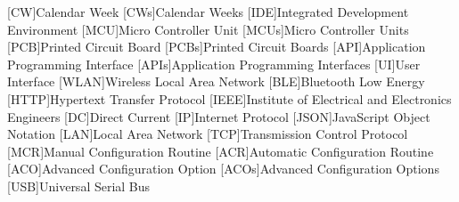 % 
\begin{acronym}[STATCOM]    %
%
[CW]{Calendar Week}
[CWs]{Calendar Weeks}
%
[IDE]{Integrated Development Environment}
%
[MCU]{Micro Controller Unit}
[MCUs]{Micro Controller Units}
%
[PCB]{Printed Circuit Board}
[PCBs]{Printed Circuit Boards}
%
[API]{Application Programming Interface}
[APIs]{Application Programming Interfaces}
%
[UI]{User Interface}
%
[WLAN]{Wireless Local Area Network}
%
[BLE]{Bluetooth Low Energy}
%
[HTTP]{Hypertext Transfer Protocol}
%
[IEEE]{Institute of Electrical and Electronics Engineers}
%
[DC]{Direct Current}
%
[IP]{Internet Protocol}
%
[JSON]{JavaScript Object Notation}
%
[LAN]{Local Area Network}
%
[TCP]{Transmission Control Protocol}
%
[MCR]{Manual Configuration Routine}
%
[ACR]{Automatic Configuration Routine}
%
[ACO]{Advanced Configuration Option}
[ACOs]{Advanced Configuration Options}
%
[USB]{Universal Serial Bus}
%
\end{acronym}
%